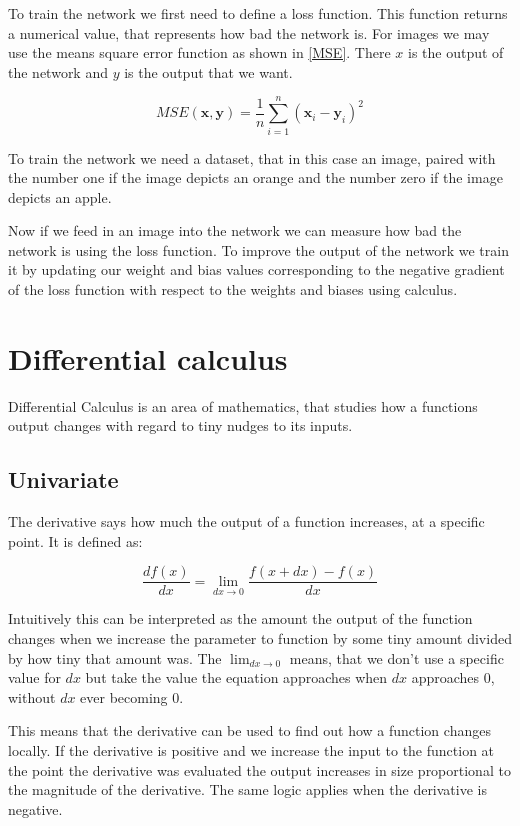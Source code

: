 To train the network we first need to define a loss function. This function returns a numerical value, that represents how bad the network is. For images we may use the means square error function as shown in \cref{MSE}. There $x$ is the output of the network and $y$ is the output that we want.

\begin{equation}
	MSE(\bm{x}, \bm{y}) = \frac{1}{n}\sum_{i=1}^{n}{(\bm{x}_i - \bm{y}_i)^2}
	\label{MSE}
\end{equation}

To train the network we need a dataset, that in this case an image, paired with the number one if the image depicts an orange and the number zero if the image depicts an apple.

Now if we feed in an image into the network we can measure how bad the network is using the loss function. To improve the output of the network we train it by updating our weight and bias values corresponding to the negative gradient of the loss function with respect to the weights and biases using calculus.


\section{Differential calculus}
Differential Calculus is an area of mathematics, that studies how a functions output changes with regard to tiny nudges to its inputs.


\subsection{Univariate}
The derivative says how much the output of a function increases, at a specific point. It is defined as:

\begin{equation}
	\frac{df(x)}{dx} = \lim_{dx \to 0}\frac{f(x + dx) - f(x)}{dx}
\end{equation}

Intuitively this can be interpreted as the amount the output of the function changes when we increase the parameter to function by some tiny amount divided by how tiny that amount was. The $\lim_{dx \to 0}$ means, that we don't use a specific value for $dx$ but take the value the equation approaches when $dx$ approaches $0$, without $dx$ ever becoming $0$.

This means that the derivative can be used to find out how a function changes locally. If the derivative is positive and we increase the input to the function at the point the derivative was evaluated the output increases in size proportional to the magnitude of the derivative. The same logic applies when the derivative is negative.


